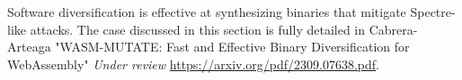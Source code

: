
\begin{tcolorbox}[title=Contribution paper,boxrule=1pt,arc=.2em,boxsep=1.0mm]
    Software diversification is effective at synthesizing \wasm binaries that mitigate Spectre-like attacks. 
    The case discussed in this section is fully detailed in Cabrera-Arteaga \etal "WASM-MUTATE: Fast and Effective Binary Diversification for WebAssembly"
    \emph{Under review}
    \url{https://arxiv.org/pdf/2309.07638.pdf}. 
\end{tcolorbox}



